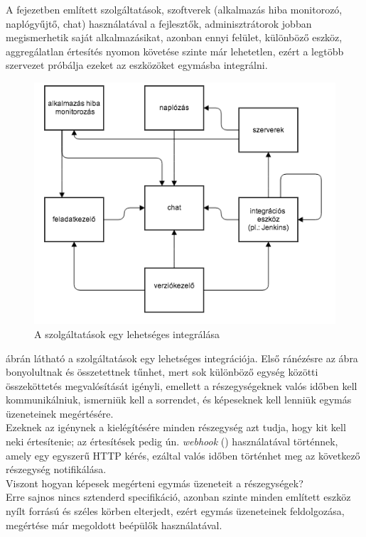 A fejezetben említett szolgáltatások, szoftverek (alkalmazás hiba monitorozó, naplógyűjtő, chat) használatával a fejlesztők, adminisztrátorok jobban megismerhetik saját alkalmazásikat, azonban ennyi felület, különböző eszköz, aggregálatlan értesítés nyomon követése szinte már lehetetlen, ezért a legtöbb szervezet próbálja ezeket az eszközöket egymásba integrálni.
\begin{figure}[ht]
	\centering
		\includegraphics[scale=1.0]{assets/integrated_services.png}%
		\caption[DUMMY]%
		{A szolgáltatások egy lehetséges integrálása}%
		\label{fig:integrated-services}
\end{figure}
 ábrán látható a szolgáltatások egy lehetséges integrációja. Első ránézésre az ábra bonyolultnak és összetettnek tűnhet, mert sok különböző egység közötti összeköttetés megvalósítását igényli, emellett a részegységeknek valós időben kell kommunikálniuk, ismerniük kell a sorrendet, és képeseknek kell lenniük egymás üzeneteinek megértésére.\\
Ezeknek az igénynek a kielégítésére minden részegység azt tudja, hogy kit kell neki értesítenie; az értesítések pedig ún. \emph{webhook} (\cite{web_hook}) használatával történnek, amely egy egyszerű HTTP kérés, ezáltal valós időben történhet meg az következő részegység notifikálása.\\
Viszont hogyan képesek megérteni egymás üzeneteit a részegységek?\\
Erre sajnos nincs sztenderd specifikáció, azonban szinte minden említett eszköz nyílt forrású és széles körben elterjedt, ezért egymás üzeneteinek feldolgozása, megértése már megoldott beépülők használatával.\\

